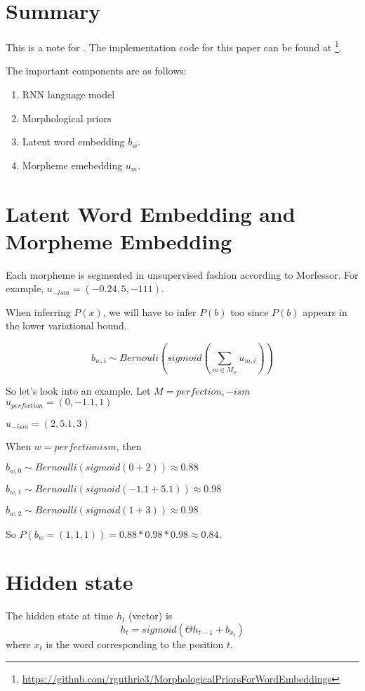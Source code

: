 \documentclass[11pt]{article}
\begin{document}
\section{Summary}

This is a note for \cite{bhatia-guthrie-eisenstein:2016:EMNLP2016}.
The implementation code for this paper can be found at \footnote{\url{https://github.com/rguthrie3/MorphologicalPriorsForWordEmbeddings}}.

The important components are as follows:
\begin{enumerate}
 \item RNN language model
 \item Morphological priors
 \item Latent word embedding $b_w$.
 \item Morpheme emebedding $u_m$.
\end{enumerate}

\section{Latent Word Embedding and Morpheme Embedding}
Each morpheme is segmented in unsupervised fashion according to Morfessor. For example, $u_{-ism} = (-0.24, 5, -111)$.

When inferring $P(x)$, we will have to infer $P(b)$ too since $P(b)$ appears in the lower variational bound.



$$
b_{w,i} \sim Bernouli(sigmoid(\sum_{m \in M_w} u_{m,i}))
$$

So let's look into an example. 
Let $M = {perfection, -ism}$
$u_{perfection} = (0, -1.1, 1)$ 

$u_{-ism} = (2, 5.1, 3)$ 

When $w = perfectionism$, then

$b_{w,0} \sim Bernoulli(sigmoid(0 + 2)) \approx 0.88$

$b_{w,1} \sim Bernoulli(sigmoid(-1.1 + 5.1)) \approx 0.98$

$b_{w,2} \sim Bernoulli(sigmoid(1 + 3)) \approx 0.98$

So $P(b_w = (1, 1, 1)) = 0.88 * 0.98 * 0.98 \approx 0.84$.

\section{Hidden state}
The hidden state at time $h_t$ (vector) is
$$
h_t = sigmoid(\Theta h_{t-1} + b_{x_t})
$$
where $x_t$ is the word corresponding to the position $t$.



\end{document}
